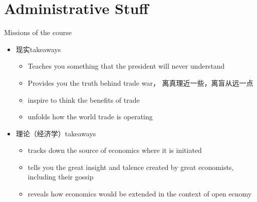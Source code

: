 \documentclass[10pt,hyperref={CJKbookmarks=true},xcolor=dvipsnames,aspectratio=169]{beamer}
\begin{document}
\section{Administrative Stuff}
\begin{frame}{Missions of the course}

\begin{itemize}
\item 现实takeaways
\begin{itemize}


\item Teaches you something that the president will never understand
\item Provides you the truth behind trade war， 离真理近一些，离盲从远一点

\item inspire to think the benefits of trade
\item unfolds how the world trade is operating
\end{itemize}
\item 理论（经济学）takeaways
\begin{itemize}

\item tracks down the source of economics where it is initiated
\item tells you the great insight and talence created by great economists,
including their gossip
\item reveals how economics would be extended in the context of open ecnomy
\end{itemize}

\end{itemize}
\end{frame}
\end{document}
